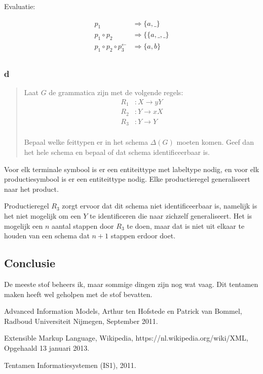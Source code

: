 \documentclass[10pt]{article}
\begin{document}
Evaluatie: 

\begin{align*}
  p_1 &\Rightarrow \{a, \_\} \\
  p_1 \circ p_2                      & \Rightarrow \{ \{a, \_, \_ \} \\
  p_1 \circ p_2 \circ p_3^\leftarrow & \Rightarrow \{ a, b \}        \\
\end{align*}

\subsubsection{d}
\begin{quote} 

  Laat $G$ de grammatica zijn met de volgende regels: 
  \begin{align*}
    R_1 & : X \rightarrow yY \\
    R_2 & : Y \rightarrow xX \\
    R_3 & : Y \rightarrow Y  \\
  \end{align*}

  Bepaal welke feittypen er in het schema $\Delta(G)$ moeten komen. Geef dan
  het hele schema en bepaal of dat schema identificeerbaar is.

\end{quote}

Voor elk terminale symbool is er een entiteittype met labeltype nodig, en voor
elk productiesymbool is er een entiteittype nodig. Elke productieregel
generaliseert naar het product.

Productieregel $R_3$ zorgt ervoor dat dit schema niet identificeerbaar is,
namelijk is het niet mogelijk om een $Y$ te identificeren die naar zichzelf
generaliseert. Het is mogelijk een $n$ aantal stappen door $R_3$ te doen, maar
dat is niet uit elkaar te houden van een schema dat $n+1$ stappen erdoor doet.

\subsection{Conclusie}
De meeste stof beheers ik, maar sommige dingen zijn nog wat vaag. Dit tentamen
maken heeft wel geholpen met de stof bevatten.


\begin{thebibliography}{9}
    Advanced Information Models, 
    Arthur ten Hofstede en Patrick van Bommel,
    Radboud Universiteit Nijmegen,
    September 2011.

    Extensible Markup Language,
    Wikipedia,
    https://nl.wikipedia.org/wiki/XML,
    Opgehaald 13 januari 2013.

    Tentamen Informatiesystemen (IS1), 2011.
\end{thebibliography}
\end{document}
